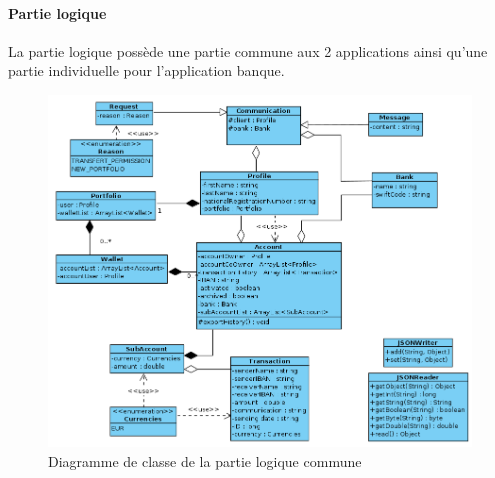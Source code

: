 \paragraph{Partie logique} La partie logique possède une partie commune aux 2 applications ainsi qu'une partie individuelle pour l’application banque.

\begin{figure}[ht]
\centering
\includegraphics[scale=0.37]{img/ClassCommonPart.png}
\caption{Diagramme de classe de la partie logique commune}
\label{fig1}
\end{figure}

